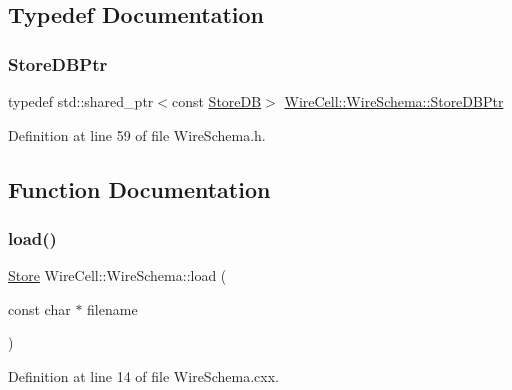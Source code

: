 \subsection{Typedef Documentation}
\mbox{\label{namespace_wire_cell_1_1_wire_schema_a9b93b8d397f153737ab0ba52066308e2}} 
\subsubsection{\texorpdfstring{Store\+D\+B\+Ptr}{StoreDBPtr}}
{\footnotesize\ttfamily typedef std\+::shared\+\_\+ptr$<$const \hyperlink{struct_wire_cell_1_1_wire_schema_1_1_store_d_b}{Store\+DB}$>$ \hyperlink{namespace_wire_cell_1_1_wire_schema_a9b93b8d397f153737ab0ba52066308e2}{Wire\+Cell\+::\+Wire\+Schema\+::\+Store\+D\+B\+Ptr}}



Definition at line 59 of file Wire\+Schema.\+h.



\subsection{Function Documentation}
\mbox{\label{namespace_wire_cell_1_1_wire_schema_a0543dcae10ded4ff64c32a3e43743cbb}} 
\subsubsection{\texorpdfstring{load()}{load()}}
{\footnotesize\ttfamily \hyperlink{class_wire_cell_1_1_wire_schema_1_1_store}{Store} Wire\+Cell\+::\+Wire\+Schema\+::load (\begin{DoxyParamCaption}\item[{const char $\ast$}]{filename }\end{DoxyParamCaption})}



Definition at line 14 of file Wire\+Schema.\+cxx.

